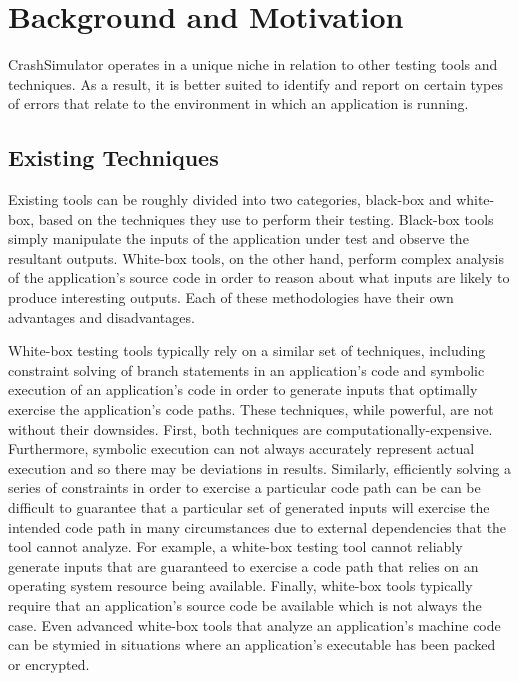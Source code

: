 \section{Background and Motivation}

    CrashSimulator operates in a unique niche in relation to other testing tools and techniques. As a result, it is
    better suited to identify and report on certain types of errors that relate to the environment in which an
    application is running.

    \subsection{Existing Techniques}

        Existing tools can be roughly divided into two categories, black-box and white-box, based on the techniques they
        use to perform their testing. Black-box tools simply manipulate the inputs of the application under test and
        observe the resultant outputs. White-box tools, on the other hand, perform complex analysis of the application's
        source code in order to reason about what inputs are likely to produce interesting outputs. Each of these
        methodologies have their own advantages and disadvantages.

        White-box testing tools typically rely on a similar set of techniques, including constraint solving of branch
        statements in an application's code and symbolic execution of an application's code in order to generate inputs
        that optimally exercise the application's code paths. These techniques, while powerful, are not without their
        downsides. First, both techniques are computationally-expensive. Furthermore, symbolic execution can not always
        accurately represent actual execution and so there may be deviations in results. Similarly, efficiently solving
        a series of constraints in order to exercise a particular code path can be can be difficult to guarantee that a
        particular set of generated inputs will exercise the intended code path in many circumstances due to external
        dependencies that the tool cannot analyze. For example, a white-box testing tool cannot reliably generate inputs
        that are guaranteed to exercise a code path that relies on an operating system resource being available.
        Finally, white-box tools typically require that an application's source code be available which is not always
        the case. Even advanced white-box tools that analyze an application's machine code can be stymied in situations
        where an application's executable has been packed or encrypted.

